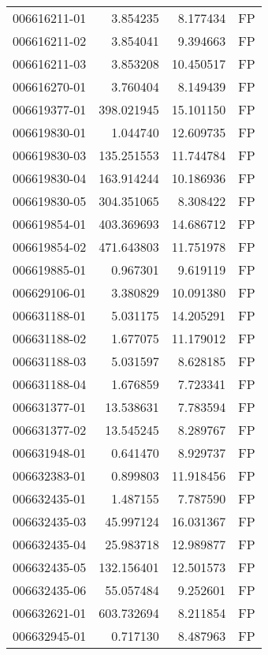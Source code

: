 \begin{tabular}{lrrl}
006616211-01 &    3.854235 &       8.177434 &   FP \\
006616211-02 &    3.854041 &       9.394663 &   FP \\
006616211-03 &    3.853208 &      10.450517 &   FP \\
006616270-01 &    3.760404 &       8.149439 &   FP \\
006619377-01 &  398.021945 &      15.101150 &   FP \\
006619830-01 &    1.044740 &      12.609735 &   FP \\
006619830-03 &  135.251553 &      11.744784 &   FP \\
006619830-04 &  163.914244 &      10.186936 &   FP \\
006619830-05 &  304.351065 &       8.308422 &   FP \\
006619854-01 &  403.369693 &      14.686712 &   FP \\
006619854-02 &  471.643803 &      11.751978 &   FP \\
006619885-01 &    0.967301 &       9.619119 &   FP \\
006629106-01 &    3.380829 &      10.091380 &   FP \\
006631188-01 &    5.031175 &      14.205291 &   FP \\
006631188-02 &    1.677075 &      11.179012 &   FP \\
006631188-03 &    5.031597 &       8.628185 &   FP \\
006631188-04 &    1.676859 &       7.723341 &   FP \\
006631377-01 &   13.538631 &       7.783594 &   FP \\
006631377-02 &   13.545245 &       8.289767 &   FP \\
006631948-01 &    0.641470 &       8.929737 &   FP \\
006632383-01 &    0.899803 &      11.918456 &   FP \\
006632435-01 &    1.487155 &       7.787590 &   FP \\
006632435-03 &   45.997124 &      16.031367 &   FP \\
006632435-04 &   25.983718 &      12.989877 &   FP \\
006632435-05 &  132.156401 &      12.501573 &   FP \\
006632435-06 &   55.057484 &       9.252601 &   FP \\
006632621-01 &  603.732694 &       8.211854 &   FP \\
006632945-01 &    0.717130 &       8.487963 &   FP \\

\end{tabular}
